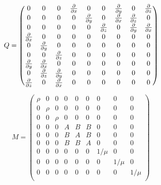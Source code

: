 \documentclass[pdftex,a4paper,parskip,listof=totoc,bibliography=totoc,onehalfspacing,12pt]{scrreprt}
\begin{document}
\begin{equation}
Q=
 \begin{pmatrix}
   0          & 0         & 0         & \pdv{}{x} & 0         & 0         & \pdv{}{y} & 0         & \pdv{}{z}\\
   0          & 0         & 0         & 0         & \pdv{}{y} & 0         & \pdv{}{x} & \pdv{}{z} & 0        \\
   0          & 0         & 0         & 0         & 0         & \pdv{}{z} & 0         & \pdv{}{y} & \pdv{}{x}\\
   \pdv{}{x}  & 0         & 0         & 0         & 0         & 0         & 0         & 0         & 0        \\
   0          & \pdv{}{y} & 0         & 0         & 0         & 0         & 0         & 0         & 0        \\
   0          & 0         & \pdv{}{z} & 0         & 0         & 0         & 0         & 0         & 0        \\
   \pdv{}{y}  & \pdv{}{x} &  0        & 0         & 0         & 0         & 0         & 0         & 0        \\
   0          & \pdv{}{z} & \pdv{}{y} & 0         & 0         & 0         & 0         & 0         & 0        \\
   \pdv{}{z}  & 0         & \pdv{}{x} & 0         & 0         & 0         & 0         & 0         & 0        \\
 \end{pmatrix}
\end{equation}

\begin{equation}
M=
 \begin{pmatrix}
   \rho       & 0         & 0         & 0         & 0         & 0         & 0         & 0         & 0       \\
   0          & \rho      & 0         & 0         & 0         & 0         & 0         & 0         & 0        \\
   0          & 0         & \rho      & 0         & 0         & 0         & 0         & 0         & 0        \\
   0          & 0         & 0         & A         & B         & B         & 0         & 0         & 0        \\
   0          & 0         & 0         & B         & A         & B         & 0         & 0         & 0        \\
   0          & 0         & 0         & B         & B         & A         & 0         & 0         & 0        \\
   0          & 0         & 0         & 0         & 0         & 0         & 1/\mu      & 0         & 0        \\
   0          & 0         & 0         & 0         & 0         & 0         & 0         & 1/\mu      & 0        \\
   0          & 0         & 0         & 0         & 0         & 0         & 0         & 0         & 1/\mu     \\
 \end{pmatrix}
\end{equation}
\end{document}

